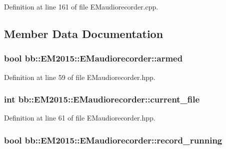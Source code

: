 Definition at line 161 of file E\+Maudiorecorder.\+cpp.



\subsection{Member Data Documentation}
\hypertarget{classbb_1_1_e_m2015_1_1_e_maudiorecorder_a253612529d8c677041aa5e221dff465e}{}
\subsubsection[{armed}]{\setlength{\rightskip}{0pt plus 5cm}bool bb\+::\+E\+M2015\+::\+E\+Maudiorecorder\+::armed}\label{classbb_1_1_e_m2015_1_1_e_maudiorecorder_a253612529d8c677041aa5e221dff465e}


Definition at line 59 of file E\+Maudiorecorder.\+hpp.

\hypertarget{classbb_1_1_e_m2015_1_1_e_maudiorecorder_a77084ddb54482790b527163fba9c8173}{}
\subsubsection[{current\+\_\+file}]{\setlength{\rightskip}{0pt plus 5cm}int bb\+::\+E\+M2015\+::\+E\+Maudiorecorder\+::current\+\_\+file}\label{classbb_1_1_e_m2015_1_1_e_maudiorecorder_a77084ddb54482790b527163fba9c8173}


Definition at line 61 of file E\+Maudiorecorder.\+hpp.

\hypertarget{classbb_1_1_e_m2015_1_1_e_maudiorecorder_a6fa9a7c2490d5a76bbfaeb3561e25247}{}
\subsubsection[{record\+\_\+running}]{\setlength{\rightskip}{0pt plus 5cm}bool bb\+::\+E\+M2015\+::\+E\+Maudiorecorder\+::record\+\_\+running}\label{classbb_1_1_e_m2015_1_1_e_maudiorecorder_a6fa9a7c2490d5a76bbfaeb3561e25247}


